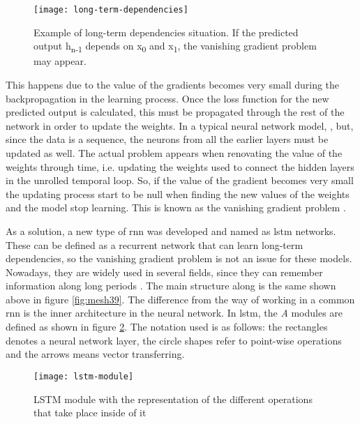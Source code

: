 	\begin{figure}[h]
		\centering
		\captionsetup{justification=centering}
		\texttt{[image: long-term-dependencies]}
		\caption{Example of long-term dependencies situation. If the predicted output h\textsubscript{n-1} depends on x\textsubscript{0} and x\textsubscript{1}, the vanishing gradient problem may appear.}
		\label{fig:mesh40}
	\end{figure}
	
	This happens due to the value of the gradients becomes very small during the backpropagation in the learning process. Once the loss function for the new predicted output is calculated, this must be propagated through the rest of the network in order to update the weights. In a typical neural network model, , but, since the data is a sequence, the neurons from all the earlier layers must be updated as well. The actual problem appears when renovating the value of the weights through time, i.e. updating the weights used to connect the hidden layers in the unrolled temporal loop. So, if the value of the gradient becomes very small the updating process start to be null when finding the new values of the weights and the model stop learning. This is known as the vanishing gradient problem \cite{SuperDataScienceTeam2018}.
	
	As a solution, a new type of \acrshort{rnn} was developed and named as \acrfull{lstm} networks. These can be defined as a recurrent network that can learn long-term dependencies, so the vanishing gradient problem is not an issue for these models. Nowadays, they are widely used in several fields, since they can remember information along long periods \cite{Olah2015}. The main structure along is the same shown above in figure \ref{fig:mesh39}. The difference from the way of working in a common \acrshort{rnn} is the inner architecture in the neural network. In \acrshort{lstm}, the \textit{A} modules are defined as shown in figure \ref{fig:mesh41}. The notation used is as follows: the rectangles denotes a neural network layer, the circle shapes refer to point-wise operations and the arrows means vector transferring.
	
	\begin{figure}
		\centering
		\captionsetup{justification=centering}
		\texttt{[image: lstm-module]}
		\caption{LSTM module with the representation of the different operations that take place inside of it}
		\label{fig:mesh41}
	\end{figure}

